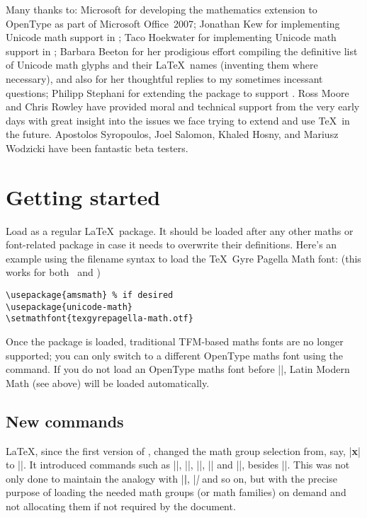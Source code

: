 Many thanks to:
Microsoft for developing the mathematics extension to OpenType as part of
Microsoft Office~2007;
Jonathan Kew for implementing Unicode math support in \XeTeX;
Taco Hoekwater for implementing Unicode math support in \LuaTeX;
Barbara Beeton for her prodigious effort compiling the definitive list of Unicode math
glyphs and their \LaTeX\ names (inventing them where necessary), and also
for her thoughtful replies to my sometimes incessant questions;
Philipp Stephani for extending the package to support \LuaTeX.
Ross Moore and Chris Rowley have provided moral and technical support
from the very early days with great insight into the issues we face trying
to extend and use \TeX\ in the future.
Apostolos Syropoulos, Joel Salomon, Khaled Hosny, and Mariusz Wodzicki
have been fantastic beta testers.

\section{Getting started}

Load  as a regular \LaTeX\ package. It should be loaded
after any other maths or font-related package in case it needs to overwrite
their definitions. Here's an example using the filename syntax to load the \TeX\ Gyre Pagella Math font: (this works for both \XeLaTeX\ and \LuaLaTeX)
\begin{Verbatim}
\usepackage{amsmath} % if desired
\usepackage{unicode-math}
\setmathfont{texgyrepagella-math.otf}
\end{Verbatim}

Once the package is loaded, traditional TFM-based maths fonts are no longer supported;
you can only switch to a different OpenType maths font using the  command.
If you do not load an OpenType maths font before ||, Latin Modern Math (see above) will be loaded automatically.

\subsection{New commands}
\LaTeX, since the first version of \LaTeXe, changed the math group
selection from, say, |{\bf x}| to ||. It introduced commands
such as |\mathbf|, |\mathit|, |\mathsf|, |\mathtt| and |\mathcal|,
besides |\mathnormal|.  This was not only done to maintain the analogy
with |\textbf|, |\textit| and so on, but with the precise purpose of
loading the needed math groups (or math families) on demand and not
allocating them if not required by the document.

